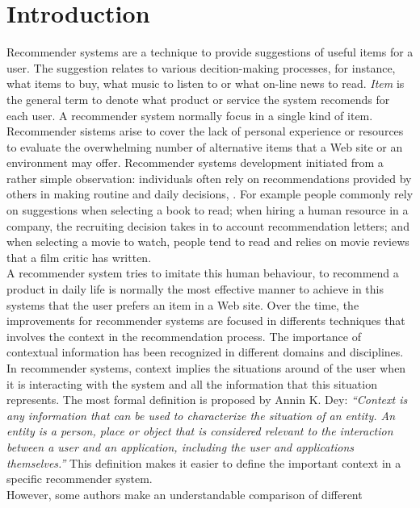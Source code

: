 \section{Introduction} \label{intro} 

Recommender systems are a technique to provide suggestions of 
useful items for a user. The suggestion relates to various
decition-making processes, for instance, what items to buy, what music
to listen to or what on-line news to read. \textit{Item} is the general
term to denote what product or service  the system recomends for each
user. A recommender system normally focus in a single kind of item.
Recommender sistems arise to cover the lack of personal experience or resources to
evaluate the overwhelming number of alternative items that a Web site or an environment 
may offer\cite{resnick1997recommender}.
Recommender systems development initiated from a rather simple
observation: individuals often rely on recommendations provided by
others in making routine and daily decisions\cite{mahmood2009improving},
\cite{mcsherry2009differentially}. 
For example people commonly rely on suggestions when selecting a
book to read; when hiring a human resource in a company, the recruiting decision 
takes in to account recommendation letters; and
when selecting a movie to watch, people tend to read and relies on
movie reviews that a film critic has written.\\
A recommender system tries to imitate this human behaviour, to
recommend a product in daily life is normally the most effective
manner to achieve in this systems that the user prefers an item in a
Web site. 
Over the time, the improvements for recommender systems are
focused in differents techniques that involves the context in the
recommendation process.  The importance of contextual information has
been recognized in different domains and disciplines. In recommender
systems, context implies the situations around of the user when it is
interacting with the system and all the information that this
situation represents.
The most formal definition is proposed by Annin K.
Dey\cite{dey2001understanding}: \textit{``Context is any information
that can be used to characterize the situation of an entity. An entity
is a person, place or object that is considered relevant to the
interaction between a user and an application, including the user and
applications themselves.''} This definition makes it easier to define
the important context in a specific recommender system.\\ 
However, some authors make an understandable comparison of different 
